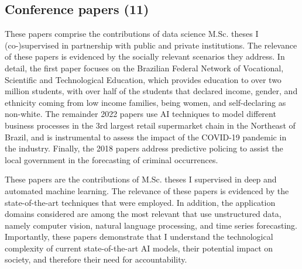 

\subsection{Conference papers (11)}

{These papers comprise the contributions of data science M.Sc. theses I (co-)supervised in partnership with public and private institutions. The relevance of these papers is evidenced by the socially relevant scenarios they address. In detail, the first paper focuses on the Brazilian Federal Network of Vocational, Scientific and Technological Education, which provides education to over two million students, with over half of the students that declared income, gender, and ethnicity coming from low income families, being women, and self-declaring as non-white. The remainder 2022 papers use AI techniques to model different business processes in the 3rd largest retail supermarket chain in the Northeast of Brazil, and is instrumental to assess the impact of the COVID-19 pandemic in the industry. Finally, the 2018 papers address predictive policing to assist the local government in the forecasting of criminal occurrences.}
\cvline{}{\hrule}

%
{These papers are the contributions of M.Sc. theses I supervised in deep and automated machine learning. The relevance of these papers is evidenced by the state-of-the-art techniques that were employed. In addition, the application domains considered are among the most relevant that use unstructured data, namely computer vision, natural language processing, and time series forecasting. Importantly, these papers demonstrate that I understand the technological complexity of current state-of-the-art AI models, their potential impact on society, and therefore their need for accountability.}

